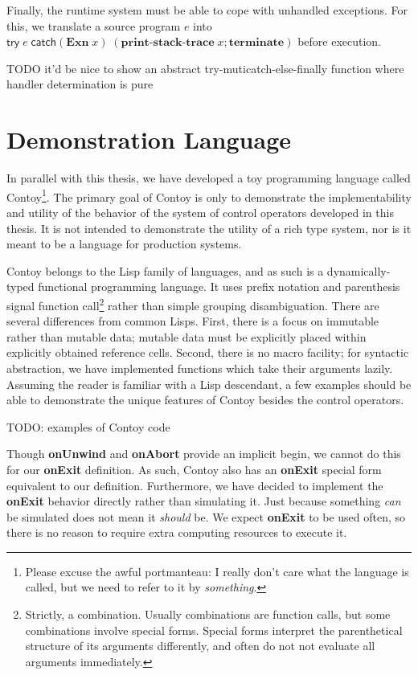 \documentclass[11pt]{article}
\begin{document}
Finally, the runtime system must be able to cope with unhandled exceptions.
For this, we translate a source program $e$ into $\textsf{try}\;e\;\textsf{catch}(\textbf{Exn}\;x)\;(\textbf{print-stack-trace}\;x;\textbf{terminate})$ before execution.


TODO it'd be nice to show an abstract try-muticatch-else-finally function where handler determination is pure


\section{Demonstration Language}
\label{sec:contoy}
In parallel with this thesis, we have developed a toy programming language called Contoy\footnote{Please excuse the awful portmanteau: I really don't care what the language is called, but we need to refer to it by \textit{something}.}.
The primary goal of Contoy is only to demonstrate the implementability and utility of the behavior of the system of control operators developed in this thesis.
It is not intended to demonstrate the utility of a rich type system, nor is it meant to be a language for production systems.

Contoy belongs to the Lisp family of languages, and as such is a dynamically-typed functional programming language.
It uses prefix notation and parenthesis signal function call\footnote{Strictly, a combination. Usually combinations are function calls, but some combinations involve special forms. Special forms interpret the parenthetical structure of its arguments differently, and often do not not evaluate all arguments immediately.} rather than simple grouping disambiguation.
There are several differences from common Lisps.
First, there is a focus on immutable rather than mutable data; mutable data must be explicitly placed within explicitly obtained reference cells.
Second, there is no macro facility; for syntactic abstraction, we have implemented functions which take their arguments lazily.
Assuming the reader is familiar with a Lisp descendant, a few examples should be able to demonstrate the unique features of Contoy besides the control operators.

TODO: examples of Contoy code


Though \textbf{onUnwind} and \textbf{onAbort} provide an implicit begin, we cannot do this for our \textbf{onExit} definition.
As such, Contoy also has an \textbf{onExit} special form equivalent to our definition.
Furthermore, we have decided to implement the \textbf{onExit} behavior directly rather than simulating it.
Just because something \emph{can} be simulated does not mean it \emph{should} be.
We expect \textbf{onExit} to be used often, so there is no reason to require extra computing resources to execute it.
\end{document}
